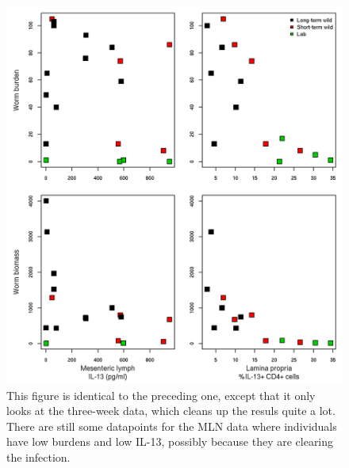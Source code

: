 \documentclass[12pt,reqno,final,pdftex]{amsart}\usepackage[]{graphicx}\usepackage[]{color}
\newenvironment{knitrout}{}{} %
\theoremstyle{plain}
\numberwithin{equation}{part}
\begin{document}
\newpage

\begin{knitrout}\scriptsize
{}\color{fgcolor}\begin{figure}

\includegraphics[width=\linewidth]{figure/unnamed-chunk-6-1} \hfill{}

\caption[This figure is identical to the preceding one, except that it only looks at the three-week data, which cleans up the resuls quite a lot]{This figure is identical to the preceding one, except that it only looks at the three-week data, which cleans up the resuls quite a lot. There are still some datapoints for the MLN data where individuals have low burdens and low IL-13, possibly because they are clearing the infection.}\label{fig:unnamed-chunk-6}
\end{figure}


\end{knitrout}


\newpage
\end{document}
